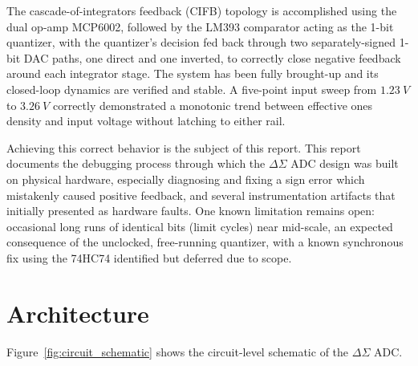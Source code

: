 \documentclass[12pt, a4paper]{article}
\begin{document}
The cascade-of-integrators feedback (CIFB) topology is accomplished using the dual op-amp MCP6002, 
followed by the LM393 comparator acting as the 1-bit quantizer, with the quantizer's decision fed back through two separately-signed 1-bit DAC paths, one direct and one inverted, to correctly close negative feedback around each integrator stage.
The system has been fully brought-up and its closed-loop dynamics are verified and stable. A five-point input sweep from $\qty{1.23}{V}$ to $\qty{3.26}{V}$ correctly demonstrated
a monotonic trend between effective ones density and input voltage without latching to either rail.

Achieving this correct behavior is the subject of this report. This report documents the debugging process through which the $\Delta\Sigma$ ADC design was built on physical hardware, especially
diagnosing and fixing a sign error which mistakenly caused positive feedback, and several instrumentation artifacts that initially presented as hardware faults. One known limitation remains open: occasional long runs of identical bits (limit cycles)
near mid-scale, an expected consequence of the unclocked, free-running quantizer, with a known synchronous fix using the 74HC74 identified but deferred due to scope.


\section{Architecture}
\label{section:architecture}

Figure~\ref{fig:circuit_schematic} shows the circuit-level schematic of the $\Delta\Sigma$ ADC.
\end{document}
